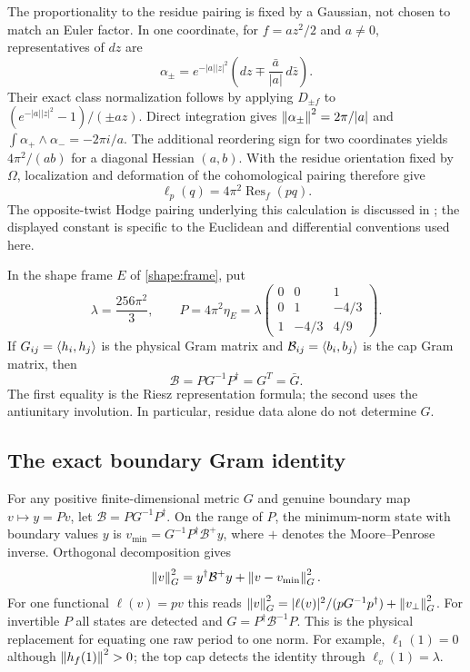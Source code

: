 The proportionality to the residue pairing is fixed by a Gaussian,
not chosen to match an Euler factor. In one coordinate, for
$f=az^2/2$ and $a\ne0$, representatives of $dz$ are
\[
\alpha_\pm=e^{-|a||z|^2}
 \left(dz\mp\frac{\bar a}{|a|}\,d\bar z\right).
\]
Their exact class normalization follows by applying $D_{\pm f}$ to
$(e^{-|a||z|^2}-1)/(\pm az)$. Direct integration gives
$\left\lVert\alpha_\pm\right\rVert^2=2\pi/|a|$ and
$\int\alpha_+\wedge\alpha_-=-2\pi i/a$.
The additional reordering sign for two coordinates yields
$4\pi^2/(ab)$ for a diagonal Hessian $(a,b)$. With the residue
orientation fixed by $\Omega$, localization and deformation of the
cohomological pairing therefore give
\begin{equation}\label{caps:residue}
\ell_p(q)=4\pi^2\operatorname{Res}_f(pq).
\end{equation}
The opposite-twist Hodge pairing underlying this calculation is
discussed in \cite{LiWen}; the displayed constant is specific to the
Euclidean and differential conventions used here.

In the shape frame $E$ of \eqref{shape:frame}, put
\[
\lambda=\frac{256\pi^2}{3},\qquad
P=4\pi^2\eta_E
 =\lambda
\begin{pmatrix}
0&0&1\\0&1&-4/3\\1&-4/3&4/9
\end{pmatrix}.
\]
If $G_{ij}=\left\langle h_i,h_j\right\rangle$ is the physical Gram matrix and
$\mathcal B_{ij}=\left\langle b_i,b_j\right\rangle$ is the cap Gram matrix, then
\begin{equation}\label{caps:reality}
\mathcal B=P G^{-1}P^\dagger=G^T=\bar G.
\end{equation}
The first equality is the Riesz representation formula; the second
uses the antiunitary involution. In particular, residue data alone
do not determine $G$.

\subsection{The exact boundary Gram identity}
For any positive finite-dimensional metric $G$ and genuine boundary
map $v\mapsto y=Pv$, let $\mathcal B=PG^{-1}P^\dagger$. On the
range of $P$, the minimum-norm state with boundary values $y$ is
$v_{\min}=G^{-1}P^\dagger\mathcal B^+y$, where $+$ denotes the
Moore--Penrose inverse. Orthogonal decomposition gives
\begin{equation}\label{caps:gram}
\left\lVert v\right\rVert_G^2=y^\dagger\mathcal B^+y+
             \left\lVert v-v_{\min}\right\rVert_G^2.
\end{equation}
For one functional $\ell(v)=pv$ this reads
$\left\lVert v\right\rVert_G^2=|\ell(v)|^2/(pG^{-1}p^\dagger)+\left\lVert v_\perp\right\rVert_G^2$.
For invertible $P$ all states are detected and
$G=P^\dagger\mathcal B^{-1}P$. This is the physical replacement for
equating one raw period to one norm. For example,
$\ell_1(1)=0$ although $\left\lVert h_f(1)\right\rVert^2>0$; the top cap detects
the identity through $\ell_v(1)=\lambda$.

